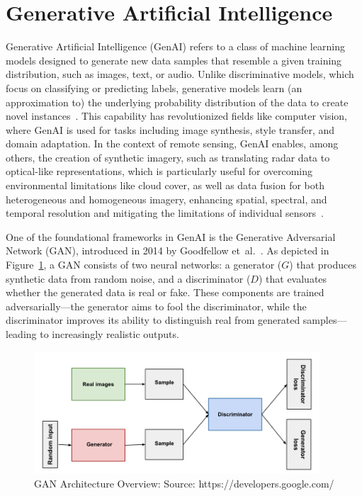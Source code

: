 \newpage

\section{Generative Artificial Intelligence}
\label{sec:genAI}
Generative Artificial Intelligence (GenAI) refers to a class of machine learning models designed to generate new data samples that resemble a given training distribution, such as images, text, or audio. Unlike discriminative models, which focus on classifying or predicting labels, generative models learn (an approximation to) the underlying probability distribution of the data to create novel instances~\cite{genAI_HS_sens_data_review}. This capability has revolutionized fields like computer vision, where GenAI is used for tasks including image synthesis, style transfer, and domain adaptation. In the context of remote sensing, GenAI enables, among others, the creation of synthetic imagery, such as translating radar data to optical-like representations, which is particularly useful for overcoming environmental limitations like cloud cover, as well as data fusion for both heterogeneous and homogeneous imagery, enhancing spatial, spectral, and temporal resolution and mitigating the limitations of individual sensors~\cite{RS_Data_Fusion_GANs_sota}.

One of the foundational frameworks in GenAI is the Generative Adversarial Network (GAN), introduced in 2014 by Goodfellow et~al.~\cite{GANs_Goodfellow}. As depicted in Figure~\ref{fig:GANs}, a GAN consists of two neural networks: a generator ($G$) that produces synthetic data from random noise, and a discriminator ($D$) that evaluates whether the generated data is real or fake. 
These components are trained adversarially—the generator aims to fool the discriminator, while the discriminator improves its ability to distinguish real from generated samples—leading to increasingly realistic outputs.
\begin{figure}[h!]
  \centering
  \includegraphics[width=0.95\textwidth]{img/GANs.png}
  \caption[GAN architecture overview]{GAN Architecture Overview: Source: https://developers.google.com/}
  \label{fig:GANs}
\end{figure}

